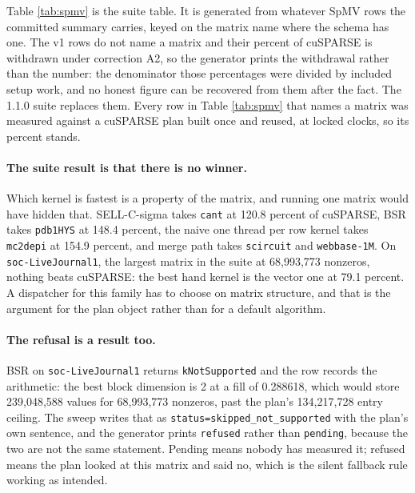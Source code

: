 Table \ref{tab:spmv} is the suite table. It is generated from whatever SpMV rows
the committed summary carries, keyed on the matrix name where the schema has one.
The v1 rows do not name a matrix and their percent of cuSPARSE is withdrawn under
correction A2, so the generator prints the withdrawal rather than the number: the
denominator those percentages were divided by included setup work, and no honest
figure can be recovered from them after the fact. The 1.1.0 suite replaces them.
Every row in Table \ref{tab:spmv} that names a matrix was measured against a
cuSPARSE plan built once and reused, at locked clocks, so its percent stands.

\paragraph{The suite result is that there is no winner.} Which kernel is fastest is
a property of the matrix, and running one matrix would have hidden that.
SELL-C-sigma takes \texttt{cant} at 120.8 percent of cuSPARSE, BSR takes
\texttt{pdb1HYS} at 148.4 percent, the naive one thread per row kernel takes
\texttt{mc2depi} at 154.9 percent, and merge path takes \texttt{scircuit} and
\texttt{webbase-1M}. On \texttt{soc-LiveJournal1}, the largest matrix in the suite
at 68,993,773 nonzeros, nothing beats cuSPARSE: the best hand kernel is the vector
one at 79.1 percent. A dispatcher for this family has to choose on matrix
structure, and that is the argument for the plan object rather than for a default
algorithm.

\paragraph{The refusal is a result too.} BSR on \texttt{soc-LiveJournal1} returns
\texttt{kNotSupported} and the row records the arithmetic: the best block dimension
is 2 at a fill of 0.288618, which would store 239,048,588 values for 68,993,773
nonzeros, past the plan's 134,217,728 entry ceiling. The sweep writes that as
\texttt{status=skipped\_not\_supported} with the plan's own sentence, and the
generator prints \texttt{refused} rather than \texttt{pending}, because the two are
not the same statement. Pending means nobody has measured it; refused means the
plan looked at this matrix and said no, which is the silent fallback rule working
as intended.

\begin{table}[htbp]
\centering

\caption{CSR SpMV rows in the committed summary, measured at locked clocks against
a cached cuSPARSE plan. Percent of cuSPARSE is withdrawn for any v1 row that names
no matrix, under correction A2 (setup work inside the vendor's timed region); a row
the plan declined reads \texttt{refused}.}
\label{tab:spmv}
\end{table}

